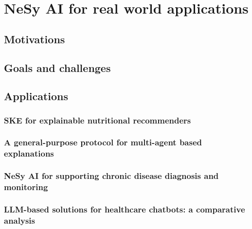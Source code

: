 
\chapter{\Ac{NeSy} \ac{AI} for real world applications}
\label{ch:nesy-ai-for-real-world-applications}

\section{Motivations}\label{sec:nesy-ai-motivations}

\section{Goals and challenges}\label{sec:nesy-ai-goals-and-challenges}

\section{Applications}\label{sec:nesy-ai-applications}

\subsection{\Ac{SKE} for explainable nutritional recommenders}\label{subsec:ske-for-explainable-nutritional-recommenders}

\subsection{A general-purpose protocol for multi-agent based explanations}\label{subsec:a-general-purpose-protocol-for-multi-agent-based-explanations}

\subsection{\Acl{NeSy} \ac{AI} for supporting chronic disease diagnosis and monitoring}\label{subsec:nesy-ai-for-supporting-chronic-disease-diagnosis-and-monitoring}

\subsection{\Ac{LLM}-based solutions for healthcare chatbots: a comparative analysis}\label{subsec:llm-based-solutions-for-healthcare-chatbots-a-comparative-analysis}

